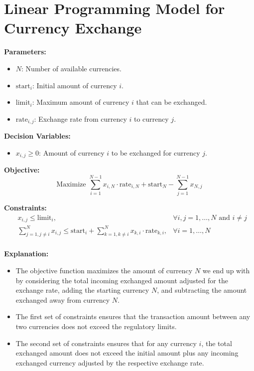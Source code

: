 \documentclass{article}
\begin{document}
\section*{Linear Programming Model for Currency Exchange}

\textbf{Parameters:}
\begin{itemize}
    \item \( N \): Number of available currencies.
    \item \( \text{start}_i \): Initial amount of currency \( i \).
    \item \( \text{limit}_i \): Maximum amount of currency \( i \) that can be exchanged.
    \item \( \text{rate}_{i,j} \): Exchange rate from currency \( i \) to currency \( j \).
\end{itemize}

\textbf{Decision Variables:}
\begin{itemize}
    \item \( x_{i,j} \geq 0 \): Amount of currency \( i \) to be exchanged for currency \( j \).
\end{itemize}

\textbf{Objective:}
\[
\text{Maximize } \sum_{i=1}^{N-1} x_{i,N} \cdot \text{rate}_{i,N} + \text{start}_N - \sum_{j=1}^{N-1} x_{N,j}
\]

\textbf{Constraints:}
\begin{align*}
    & x_{i,j} \leq \text{limit}_i, & \forall i, j = 1, \ldots, N \text{ and } i \neq j \\
    & \sum_{j=1, j \neq i}^{N} x_{i,j} \leq \text{start}_i + \sum_{k=1, k \neq i}^{N} x_{k,i} \cdot \text{rate}_{k,i}, & \forall i = 1, \ldots, N \\
\end{align*}

\textbf{Explanation:}
\begin{itemize}
    \item The objective function maximizes the amount of currency \( N \) we end up with by considering the total incoming exchanged amount adjusted for the exchange rate, adding the starting currency \( N \), and subtracting the amount exchanged away from currency \( N \).
    \item The first set of constraints ensures that the transaction amount between any two currencies does not exceed the regulatory limits.
    \item The second set of constraints ensures that for any currency \( i \), the total exchanged amount does not exceed the initial amount plus any incoming exchanged currency adjusted by the respective exchange rate.
\end{itemize}
\end{document}
